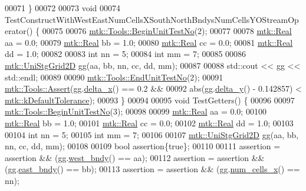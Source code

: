 \begin{DoxyCode}
00071 \}
00072 
00073 \textcolor{keywordtype}{void}
00074 TestConstructWithWestEastNumCellsXSouthNorthBndysNumCellsYOStreamOperator() \{
00075 
00076   \hyperlink{classmtk_1_1Tools_a26ee906d28523378522a75e25c3a4e19}{mtk::Tools::BeginUnitTestNo}(2);
00077 
00078   \hyperlink{group__c01-roots_gac080bbbf5cbb5502c9f00405f894857d}{mtk::Real} aa = 0.0;
00079   \hyperlink{group__c01-roots_gac080bbbf5cbb5502c9f00405f894857d}{mtk::Real} bb = 1.0;
00080   \hyperlink{group__c01-roots_gac080bbbf5cbb5502c9f00405f894857d}{mtk::Real} cc = 0.0;
00081   \hyperlink{group__c01-roots_gac080bbbf5cbb5502c9f00405f894857d}{mtk::Real} dd = 1.0;
00082 
00083   \textcolor{keywordtype}{int} nn = 5;
00084   \textcolor{keywordtype}{int} mm = 7;
00085 
00086   \hyperlink{classmtk_1_1UniStgGrid2D}{mtk::UniStgGrid2D} gg(aa, bb, nn, cc, dd, mm);
00087 
00088   std::cout << gg << std::endl;
00089 
00090   \hyperlink{classmtk_1_1Tools_ad8cf0085133dd40c913fe195bc5b9694}{mtk::Tools::EndUnitTestNo}(2);
00091   \hyperlink{classmtk_1_1Tools_aa311fada9255627d06c56b1e4fedce9e}{mtk::Tools::Assert}(gg.\hyperlink{classmtk_1_1UniStgGrid2D_aca4710004c4a7da6a9e8fd6ab32a691f}{delta\_x}() == 0.2 &&
00092                      abs(gg.\hyperlink{classmtk_1_1UniStgGrid2D_a65a78cfc80ffdbeb282ed57af4dc5cb4}{delta\_y}() - 0.142857) < 
      \hyperlink{group__c01-roots_gae914b125d81d1b97e0aee7bbc7739786}{mtk::kDefaultTolerance});
00093 \}
00094 
00095 \textcolor{keywordtype}{void} TestGetters() \{
00096 
00097   \hyperlink{classmtk_1_1Tools_a26ee906d28523378522a75e25c3a4e19}{mtk::Tools::BeginUnitTestNo}(3);
00098 
00099   \hyperlink{group__c01-roots_gac080bbbf5cbb5502c9f00405f894857d}{mtk::Real} aa = 0.0;
00100   \hyperlink{group__c01-roots_gac080bbbf5cbb5502c9f00405f894857d}{mtk::Real} bb = 1.0;
00101   \hyperlink{group__c01-roots_gac080bbbf5cbb5502c9f00405f894857d}{mtk::Real} cc = 0.0;
00102   \hyperlink{group__c01-roots_gac080bbbf5cbb5502c9f00405f894857d}{mtk::Real} dd = 1.0;
00103 
00104   \textcolor{keywordtype}{int} nn = 5;
00105   \textcolor{keywordtype}{int} mm = 7;
00106 
00107   \hyperlink{classmtk_1_1UniStgGrid2D}{mtk::UniStgGrid2D} gg(aa, bb, nn, cc, dd, mm);
00108 
00109   \textcolor{keywordtype}{bool} assertion\{\textcolor{keyword}{true}\};
00110 
00111   assertion = assertion && (gg.\hyperlink{classmtk_1_1UniStgGrid2D_af2b1712387ded85edaf2b64617d3fc13}{west\_bndy}() == aa);
00112   assertion = assertion && (gg.\hyperlink{classmtk_1_1UniStgGrid2D_a03f689eb29a6369b82ce1207c655d5ff}{east\_bndy}() == bb);
00113   assertion = assertion && (gg.\hyperlink{classmtk_1_1UniStgGrid2D_a2d182866a398aba8e4829590e85bf939}{num\_cells\_x}() == nn);

\end{DoxyCode}
